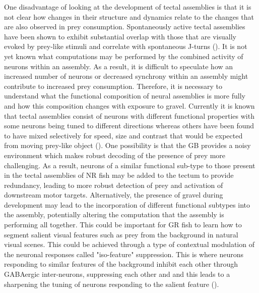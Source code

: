 One disadvantage of looking at the development of tectal assemblies is that it is not clear how changes in their structure and dynamics relate to the changes that are also observed in prey consumption.  Spontaneously active tectal assemblies have been shown to exhibit substantial overlap with those that are visually evoked by prey-like stimuli and correlate with spontaneous J-turns (\cite{Romano2015}). It is not yet known what computations may be performed by the combined activity of neurons within an assembly. As a result, it is difficult to speculate how an increased number of neurons or decreased synchrony within an assembly might contribute to increased prey consumption. Therefore, it is necessary to understand what the functional composition of neural assemblies is more fully and how this composition changes with exposure to gravel. Currently it is known that tectal assemblies consist of neurons with different functional properties with some neurons being tuned to different directions whereas others have been found to have mixed selectively for speed, size and contrast that would be expected from moving prey-like object (\cite{Romano2015, Bianco2015}). One possibility is that the GB provides a noisy environment which makes robust decoding of the presence of prey more challenging. As a result, neurons of a similar functional sub-type to those present in the tectal assemblies of NR fish may be added to the tectum to provide redundancy, leading to more robust detection of prey and activation of downstream motor targets. Alternatively, the presence of gravel during development may lead to the incorporation of different functional subtypes into the assembly, potentially altering the computation that the assembly is performing all together. This could be important for GR fish to learn how to segment salient visual features such as prey from the background in natural visual scenes. This could be achieved through a type of contextual modulation of the neuronal responses called "iso-feature" suppression. This is where neurons responding to similar features of the background inhibit each other through GABAergic inter-neurons, suppressing each other and and this leads to a sharpening the tuning of neurons responding to the salient feature (\cite{Zhaoping2016FromNeuroscience, Zhaoping2012PropertiesBehavior, Pecka2014Experience-DependentScenes}). 

